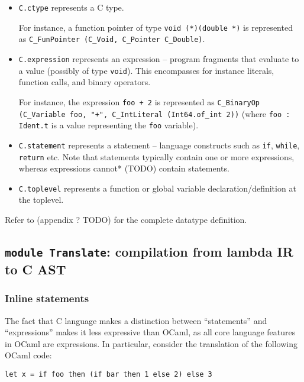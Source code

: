 \documentclass[12pt,a4paper,twoside,openright]{report}
\begin{document}
\begin{itemize}
  \item
    \lstinline!C.ctype! represents a C type.
    
    For instance, a function pointer of type \lstinline!void (*)(double *)! is represented as \lstinline!C_FunPointer (C_Void, C_Pointer C_Double)!.
  \item
    \lstinline!C.expression! represents an expression -- program fragments that evaluate to a value (possibly of type \lstinline!void!). This encompasses for instance literals, function calls, and binary operators.

    For instance, the expression \lstinline!foo + 2! is represented as \lstinline!C_BinaryOp (C_Variable foo, "+", C_IntLiteral (Int64.of_int 2))! (where \lstinline!foo : Ident.t! is a value representing the \lstinline!foo! variable).

	\item
		\lstinline!C.statement! represents a statement -- language constructs such as \lstinline!if!, \lstinline!while!, \lstinline!return! etc. Note that statements typically contain one or more expressions, whereas expressions cannot* (TODO) contain statements.

	\item
		\lstinline!C.toplevel! represents a function or global variable declaration/definition at the toplevel.
\end{itemize}

Refer to (appendix ? TODO) for the complete datatype definition.

\subsection{\texttt{module Translate}: compilation from lambda IR to C AST}

\subsubsection{Inline statements}

The fact that C language makes a distinction between ``statements'' and ``expressions'' makes it less expressive than OCaml, as all core language features in OCaml are expressions. In particular, consider the translation of the following OCaml code:

\begin{lstlisting}
let x = if foo then (if bar then 1 else 2) else 3
\end{lstlisting}
\end{document}
